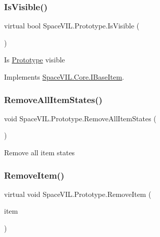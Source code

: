 \subsubsection{\texorpdfstring{Is\+Visible()}{IsVisible()}}
{\footnotesize\ttfamily virtual bool Space\+V\+I\+L.\+Prototype.\+Is\+Visible (\begin{DoxyParamCaption}{ }\end{DoxyParamCaption})\hspace{0.3cm}{\ttfamily [virtual]}}



Is \mbox{\hyperlink{class_space_v_i_l_1_1_prototype}{Prototype}} visible 



Implements \mbox{\hyperlink{interface_space_v_i_l_1_1_core_1_1_i_base_item}{Space\+V\+I\+L.\+Core.\+I\+Base\+Item}}.

\mbox{\label{class_space_v_i_l_1_1_prototype_ac5b68167a1e8160c1af3033f94e80858}} 
\subsubsection{\texorpdfstring{Remove\+All\+Item\+States()}{RemoveAllItemStates()}}
{\footnotesize\ttfamily void Space\+V\+I\+L.\+Prototype.\+Remove\+All\+Item\+States (\begin{DoxyParamCaption}{ }\end{DoxyParamCaption})}



Remove all item states 

\mbox{\label{class_space_v_i_l_1_1_prototype_a7a2aabccfe6389f71d0265fa73f0ae87}} 
\subsubsection{\texorpdfstring{Remove\+Item()}{RemoveItem()}}
{\footnotesize\ttfamily virtual void Space\+V\+I\+L.\+Prototype.\+Remove\+Item (\begin{DoxyParamCaption}\item[{\mbox{\hyperlink{interface_space_v_i_l_1_1_core_1_1_i_base_item}{I\+Base\+Item}}}]{item }\end{DoxyParamCaption})\hspace{0.3cm}{\ttfamily [virtual]}}




